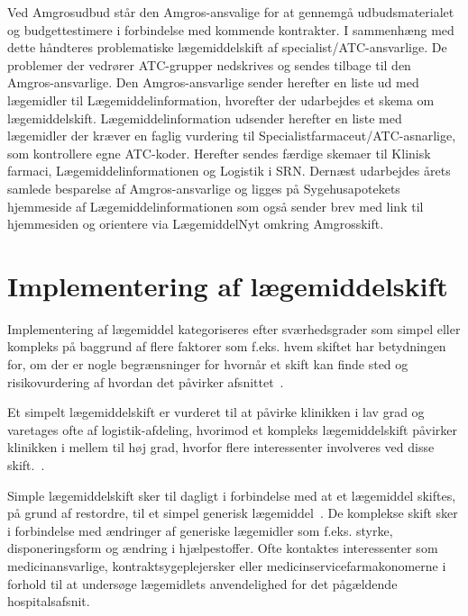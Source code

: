 Ved Amgrosudbud står den Amgros-ansvalige  for at gennemgå udbudsmaterialet og budgettestimere i forbindelse med kommende kontrakter. I sammenhæng med dette håndteres problematiske lægemiddelskift af specialist/ATC-ansvarlige. De problemer der vedrører ATC-grupper nedskrives og sendes tilbage til den Amgros-ansvarlige. Den Amgros-ansvarlige sender herefter en liste ud med lægemidler til Lægemiddelinformation, hvorefter der udarbejdes et skema om lægemiddelskift. Lægemiddelinformation udsender herefter en liste med lægemidler der kræver en faglig vurdering til Specialistfarmaceut/ATC-asnarlige, som kontrollere egne ATC-koder. Herefter sendes færdige skemaer til Klinisk farmaci, Lægemiddelinformationen og Logistik i SRN. Dernæst udarbejdes årets samlede besparelse af Amgros-ansvarlige og ligges på Sygehusapotekets hjemmeside af Lægemiddelinformationen som også sender brev med link til hjemmesiden og orientere via LægemiddelNyt omkring Amgrosskift. 

\section{Implementering af lægemiddelskift}
Implementering af lægemiddel kategoriseres efter sværhedsgrader som simpel eller kompleks på baggrund af flere faktorer som f.eks. hvem skiftet har betydningen for, om der er nogle begrænsninger for hvornår et skift kan finde sted og risikovurdering af hvordan det påvirker afsnittet~\citep{Sygehusapoteket2017b}.

Et simpelt lægemiddelskift er vurderet til at påvirke klinikken i lav grad og varetages ofte af logistik-afdeling, hvorimod et kompleks lægemiddelskift påvirker klinikken i mellem til høj grad, hvorfor flere interessenter involveres ved disse skift.~\citep{Laegemiddelinformaion2017,Sygehusapoteket2017a}. 

Simple lægemiddelskift sker til dagligt i forbindelse med at et lægemiddel skiftes, på grund af restordre, til et simpel generisk lægemiddel~\citep{Laegemiddelinformaion2017}. De komplekse skift sker i forbindelse med ændringer af generiske lægemidler som f.eks. styrke, disponeringsform og ændring i hjælpestoffer. Ofte kontaktes interessenter som medicinansvarlige, kontraktsygeplejersker eller medicinservicefarmakonomerne i forhold til at undersøge lægemidlets anvendelighed for det pågældende hospitalsafsnit.~\citep{Laegemiddelinformaion2017,Sygehusapoteket2017a}

